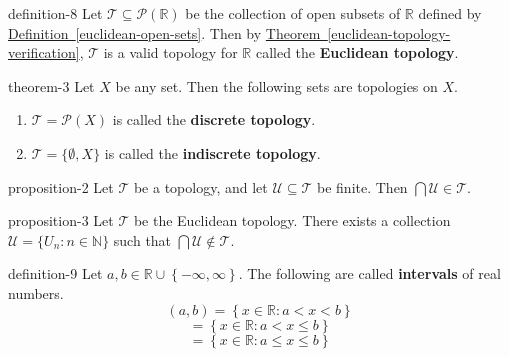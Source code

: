 \documentclass[10pt,]{article}
\newcommand{\terminology}[1]{\textbf{#1}}
\newcommand{\mb}{\mathbb}
\newcommand{\mc}{\mathcal}
\newcommand{\setBuilder}[2]{\left\{#1:#2\right\}}
\newcommand{\setList}[1]{\left\{#1\right\}}
\newcommand{\lt}{<}
\begin{document}
\begin{definition}{}{definition-8}%
\hypertarget{p-30}{}%
Let \(\mc T\subseteq\mc P(\mb R)\) be the collection of open subsets of \(\mb R\) defined by \hyperref[euclidean-open-sets]{Definition~\ref{euclidean-open-sets}}. Then by \hyperref[euclidean-topology-verification]{Theorem~\ref{euclidean-topology-verification}}, \(\mc T\) is a valid topology for \(\mb R\) called the \terminology{Euclidean topology}.%
\end{definition}
\begin{theorem}{}{}{theorem-3}%
\hypertarget{p-31}{}%
Let \(X\) be any set. Then the following sets are topologies on \(X\).%
\leavevmode%
\begin{enumerate}
\item\hypertarget{li-21}{}\(\mc T=\mc P(X)\) is called the \terminology{discrete topology}.%
\item\hypertarget{li-22}{}\(\mc T=\{\emptyset,X\}\) is called the \terminology{indiscrete topology}.%
\end{enumerate}
\end{theorem}
\begin{proposition}{}{}{proposition-2}%
\hypertarget{p-32}{}%
Let \(\mc T\) be a topology, and let \(\mc U\subseteq\mc T\) be finite. Then \(\bigcap\mc U\in\mc T\).%
\end{proposition}
\begin{proposition}{}{}{proposition-3}%
\hypertarget{p-33}{}%
Let \(\mc T\) be the Euclidean topology. There exists a collection \(\mc U=\{U_n:n\in\mb N\}\) such that \(\bigcap\mc U\not\in\mc T\).%
\end{proposition}
\begin{definition}{}{definition-9}%
\hypertarget{p-34}{}%
Let \(a,b\in\mb R\cup\setList{-\infty,\infty}\). The following are called \terminology{intervals} of real numbers.%
%
\begin{equation*}
(a,b)=\setBuilder{x\in\mb R}{a\lt x\lt b}
\end{equation*}
%
\begin{equation*}
[a,b)=\setBuilder{x\in\mb R}{a\leq x\lt b}
\end{equation*}
%
\begin{equation*}
(a,b]=\setBuilder{x\in\mb R}{a\lt x\leq b}
\end{equation*}
%
\begin{equation*}
[a,b]=\setBuilder{x\in\mb R}{a\leq x\leq b}
\end{equation*}
\end{definition}
\end{document}
